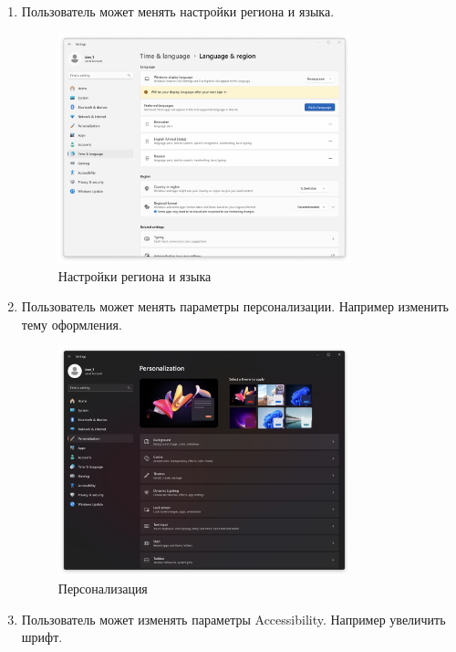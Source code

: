 \documentclass[a4paper, 14pt]{report}
\begin{document}
\begin{enumerate}
    \item {Пользователь может менять настройки региона и языка.
          \begin{figure}[H]
              \centering
              \includegraphics[width=0.8\textwidth]{../images/region_language.png}
              \caption{Настройки региона и языка}
          \end{figure}
          }
    \item {Пользователь может менять параметры персонализации. Например изменить тему оформления.
          \begin{figure}[H]
              \centering
              \includegraphics[width=0.8\textwidth]{../images/personalization.png}
              \caption{Персонализация}
          \end{figure}
          }
    \item {Пользователь может изменять параметры Accessibility. Например увеличить шрифт.
}
\end{enumerate}
\end{document}
